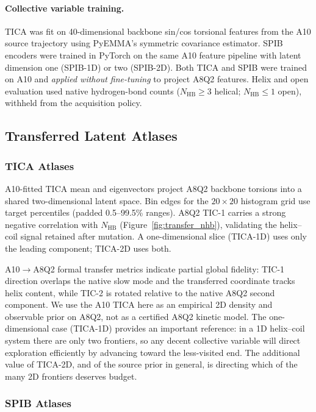 \paragraph{Collective variable training.}
TICA was fit on 40-dimensional backbone sin/cos torsional features from the A10 source trajectory using PyEMMA's symmetric covariance estimator.\cite{scherer2015pyemma}
SPIB encoders were trained in PyTorch on the same A10 feature pipeline with latent dimension one (SPIB-1D) or two (SPIB-2D).
Both TICA and SPIB were trained on A10 and \emph{applied without fine-tuning} to project A8Q2 features.
Helix and open evaluation used native hydrogen-bond counts ($N_{\mathrm{HB}}\geq 3$ helical; $N_{\mathrm{HB}}\leq 1$ open), withheld from the acquisition policy.

\subsection{Transferred Latent Atlases}
\label{sec:tica_atlas}

\subsubsection{TICA Atlases}

A10-fitted TICA mean and eigenvectors project A8Q2 backbone torsions into a shared two-dimensional latent space.
Bin edges for the $20\times 20$ histogram grid use target percentiles (padded 0.5--99.5\% ranges).
A8Q2 TIC-1 carries a strong negative correlation with $N_{\mathrm{HB}}$ (Figure~\ref{fig:transfer_nhb}), validating the helix--coil signal retained after mutation.
A one-dimensional slice (TICA-1D) uses only the leading component; TICA-2D uses both.

A10$\rightarrow$A8Q2 formal transfer metrics indicate partial global fidelity: TIC-1 direction overlaps the native slow mode and the transferred coordinate tracks helix content, while TIC-2 is rotated relative to the native A8Q2 second component.
We use the A10 TICA here as an empirical 2D density and observable prior on A8Q2, not as a certified A8Q2 kinetic model.
The one-dimensional case (TICA-1D) provides an important reference: in a 1D helix--coil system there are only two frontiers, so any decent collective variable will direct exploration efficiently by advancing toward the less-visited end.
The additional value of TICA-2D, and of the source prior in general, is directing which of the many 2D frontiers deserves budget.

\subsubsection{SPIB Atlases}

